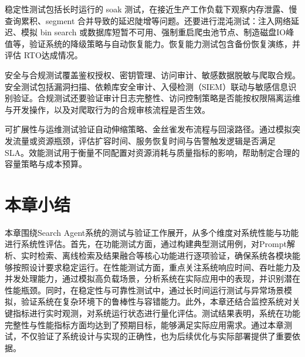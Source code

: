 稳定性测试包括长时运行的 soak 测试，在接近生产工作负载下观察内存泄露、慢查询累积、segment 合并导致的延迟陡增等问题。还要进行混沌测试：注入网络延迟、模拟 bin search 或数据库短暂不可用、强制重启爬虫池节点、制造磁盘IO峰值等，验证系统的降级策略与自动恢复能力。恢复能力测试包含备份恢复演练，并评估 RTO达成情况。

安全与合规测试覆盖鉴权授权、密钥管理、访问审计、敏感数据脱敏与爬取合规。安全测试包括漏洞扫描、依赖库安全审计、入侵检测（SIEM）联动与敏感信息识别验证。合规测试还要验证审计日志完整性、访问控制策略是否能按权限隔离运维与开发操作，以及对爬取行为的合规审核流程是否生效。

可扩展性与运维测试验证自动伸缩策略、金丝雀发布流程与回滚路径。通过模拟突发流量或资源瓶颈，评估扩容时间、服务恢复时间与告警触发逻辑是否满足 SLA。效能测试用于衡量不同配置对资源消耗与质量指标的影响，帮助制定合理的容量策略与成本预算。
\section{本章小结}
本章围绕Search Agent系统的测试与验证工作展开，从多个维度对系统性能与功能进行系统性评估。首先，在功能测试方面，通过构建典型测试用例，对Prompt解析、实时检索、离线检索及结果融合等核心功能进行逐项验证，确保系统各模块能够按照设计要求稳定运行。在性能测试方面，重点关注系统响应时间、吞吐能力及并发处理能力，通过模拟高负载场景，分析系统在实际应用中的表现，并识别潜在性能瓶颈。同时，在稳定性与可靠性测试中，通过长时间运行测试与异常场景模拟，验证系统在复杂环境下的鲁棒性与容错能力。此外，本章还结合监控系统对关键指标进行实时观测，对系统运行状态进行量化评估。测试结果表明，系统在功能完整性与性能指标方面均达到了预期目标，能够满足实际应用需求。通过本章测试，不仅验证了系统设计与实现的正确性，也为后续优化与实际部署提供了重要依据。